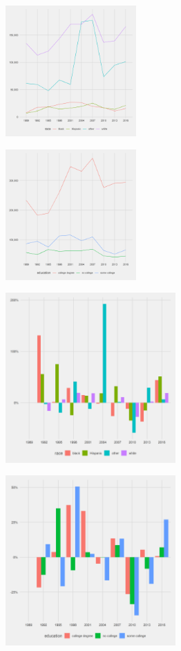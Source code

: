 \documentclass[]{scrartcl}
\begin{document}
\begin{figure}[h]
	\centering
	\begin{subfigure}{.49\textwidth}
		\centering
		\includegraphics[width=\linewidth, height=5cm]{../median wealth finance_survey _by race .png}
	\end{subfigure}
	\begin{subfigure}{.49\textwidth}
	\centering
	\includegraphics[width=\linewidth, height=5cm]{../median wealth finance_survey _by education .png}
	\end{subfigure}
	\begin{subfigure}{.49\textwidth}
	\centering
	\includegraphics[width=\linewidth, height=6.5cm]{../change_median wealth finance_survey _by race .png}
	\end{subfigure}
	\begin{subfigure}{.49\textwidth}
	\centering
	\includegraphics[width=\linewidth, height=6.5cm]{../change_median wealth finance_survey _by education .png}

\end{subfigure}
\end{figure}
\end{document}
